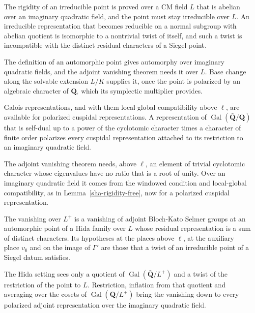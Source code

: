 The rigidity of an irreducible point is proved over a CM field $L$ that is abelian over an imaginary quadratic field, and the point must stay irreducible over $L$. An irreducible representation that becomes reducible on a normal subgroup with abelian quotient is isomorphic to a nontrivial twist of itself, and such a twist is incompatible with the distinct residual characters of a Siegel point.

The definition of an automorphic point gives automorphy over imaginary quadratic fields, and the adjoint vanishing theorem needs it over $L$. Base change along the solvable extension $L/K$ supplies it, once the point is polarized by an algebraic character of $\mathbf Q$, which its symplectic multiplier provides.

Galois representations, and with them local-global compatibility above $\ell$, are available for polarized cuspidal representations. A representation of $\operatorname{Gal}(\bar{\mathbf Q}/\mathbf Q)$ that is self-dual up to a power of the cyclotomic character times a character of finite order polarizes every cuspidal representation attached to its restriction to an imaginary quadratic field.

The adjoint vanishing theorem needs, above $\ell$, an element of trivial cyclotomic character whose eigenvalues have no ratio that is a root of unity. Over an imaginary quadratic field it comes from the windowed condition and local-global compatibility, as in Lemma~\ref{sha-rigidity-free}, now for a polarized cuspidal representation.

The vanishing over $L^+$ is a vanishing of adjoint Bloch-Kato Selmer groups at an automorphic point of a Hida family over $L$ whose residual representation is a sum of distinct characters. Its hypotheses at the places above $\ell$, at the auxiliary place $v_0$ and on the image of $\Gamma'$ are those that a twist of an irreducible point of a Siegel datum satisfies.

The Hida setting sees only a quotient of $\operatorname{Gal}(\bar{\mathbf Q}/L^+)$ and a twist of the restriction of the point to $L$. Restriction, inflation from that quotient and averaging over the cosets of $\operatorname{Gal}(\bar{\mathbf Q}/L^+)$ bring the vanishing down to every polarized adjoint representation over the imaginary quadratic field.

